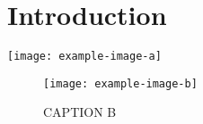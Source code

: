 \section{Introduction}
\vspace{0.5mm}
\begingroup
    \centering
    \texttt{[image: example-image-a]}
    \label{fig:A}
\endgroup
\vspace{0.5mm}

\blindtext

\begin{figure*}%
  \centering
  \texttt{[image: example-image-b]}
  \caption{CAPTION B}
  \label{fig:B}
\end{figure*}

\blindtext
\citep{pereira19}

